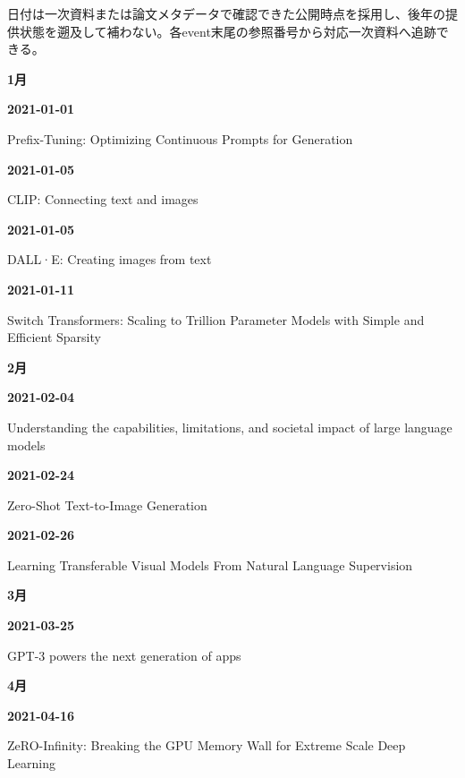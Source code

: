 \noindent 日付は一次資料または論文メタデータで確認できた公開時点を採用し、後年の提供状態を遡及して補わない。各event末尾の参照番号から対応一次資料へ追跡できる。
\par\medskip
\medskip
\noindent\textbf{1月}\par
\smallskip
\noindent\textbf{2021-01-01}\par
{\raggedright Prefix-Tuning: Optimizing Continuous Prompts for Generation\,\cite{src-dba095cd4e62}\par}
\smallskip
\noindent\textbf{2021-01-05}\par
{\raggedright CLIP: Connecting text and images\,\cite{src-bc37d5969edc}\par}
\smallskip
\noindent\textbf{2021-01-05}\par
{\raggedright DALL·E: Creating images from text\,\cite{src-f14c51ae873c}\par}
\smallskip
\noindent\textbf{2021-01-11}\par
{\raggedright Switch Transformers: Scaling to Trillion Parameter Models with Simple and Efficient Sparsity\,\cite{src-7fa5b597ba1f}\par}
\smallskip
\medskip
\noindent\textbf{2月}\par
\smallskip
\noindent\textbf{2021-02-04}\par
{\raggedright Understanding the capabilities, limitations, and societal impact of large language models\,\cite{chron-4748993efd3b}\par}
\smallskip
\noindent\textbf{2021-02-24}\par
{\raggedright Zero-Shot Text-to-Image Generation\,\cite{src-009747d6fa68}\par}
\smallskip
\noindent\textbf{2021-02-26}\par
{\raggedright Learning Transferable Visual Models From Natural Language Supervision\,\cite{src-005ad180fc46}\par}
\smallskip
\medskip
\noindent\textbf{3月}\par
\smallskip
\noindent\textbf{2021-03-25}\par
{\raggedright GPT-3 powers the next generation of apps\,\cite{chron-b148f6780615}\par}
\smallskip
\medskip
\noindent\textbf{4月}\par
\smallskip
\noindent\textbf{2021-04-16}\par
{\raggedright ZeRO-Infinity: Breaking the GPU Memory Wall for Extreme Scale Deep Learning\,\cite{src-7b8be93e524d}\par}
